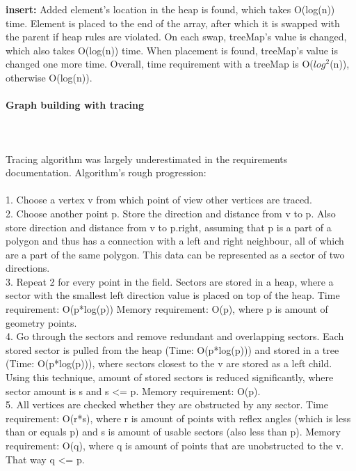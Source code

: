 \documentclass[a4paper,12pt]{article}
\begin{document}
\textbf{insert:} Added element's location in the heap is found, which takes O(log(n)) time. Element is placed to the end of the array, after which it is swapped with the parent if heap rules are violated. On each swap, treeMap's value is changed, which also takes O(log(n)) time. When placement is found, treeMap's value is changed one more time. Overall, time requirement with a treeMap is O($log^{2}$(n)), otherwise O(log(n)).
\\

\paragraph{\large Graph building with tracing} \hspace{0pt} \\
\\
Tracing algorithm was largely underestimated in the requirements documentation. Algorithm's rough progression: \\
\\
1. Choose a vertex v from which point of view other vertices are traced.\\
2. Choose another point p. Store the direction and distance from v to p. Also store direction and distance from v to p.right, assuming that p is a part of a polygon and thus has a connection with a left and right neighbour, all of which are a part of the same polygon. This data can be represented as a sector of two directions.\\
3. Repeat 2 for every point in the field. Sectors are stored in a heap, where a sector with the smallest left direction value is placed on top of the heap. Time requirement: O(p*log(p)) Memory requirement: O(p), where p is amount of geometry points.\\
4. Go through the sectors and remove redundant and overlapping sectors. Each stored sector is pulled from the heap (Time: O(p*log(p))) and stored in a tree (Time: O(p*log(p))), where sectors closest to the v are stored as a left child. Using this technique, amount of stored sectors is reduced significantly, where sector amount is s and s \textless = p. Memory requirement: O(p).\\
5. All vertices are checked whether they are obstructed by any sector. Time requirement: O(r*s), where r is amount of points with reflex angles (which is less than or equals p) and s is amount of usable sectors (also less than p). Memory requirement: O(q), where q is amount of points that are unobstructed to the v. That way q \textless = p.\\
\end{document}
